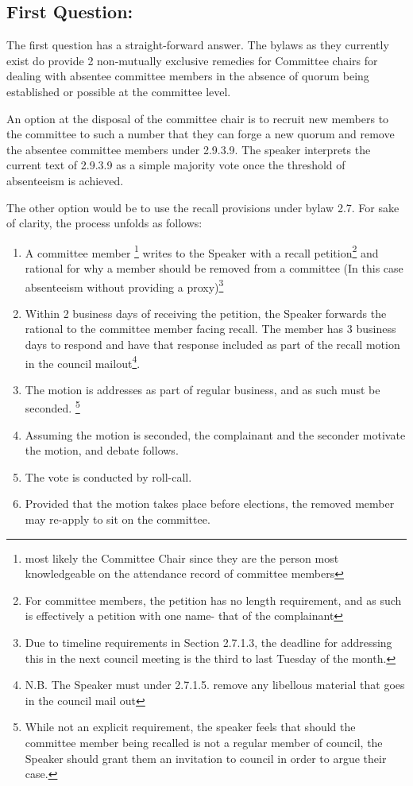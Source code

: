 \documentclass[12pt,letterpaper]{book}
\begin{document}
\subsection*{First Question:}
The first question has a straight-forward answer.  The bylaws as they currently exist do provide 2 non-mutually exclusive remedies for Committee chairs for dealing with absentee committee members in the absence of quorum being established or possible at the committee level. 

An option at the disposal of the committee chair is to recruit new members to the committee to such a number that they can forge a new quorum and remove the absentee committee members under 2.9.3.9.  The speaker interprets the current text of 2.9.3.9 as a simple majority vote once the threshold of absenteeism is achieved.    

The other option would be to use the recall provisions under bylaw 2.7. For sake of clarity, the process unfolds as follows:  

\begin{enumerate}

\item A committee member \footnote{most likely the Committee Chair since they are the person most knowledgeable on the attendance record of committee members} writes to the Speaker with a recall petition\footnote{For committee members, the petition has no length requirement, and as such is effectively a petition with one name- that of the complainant} and rational for why a member should be removed from a committee (In this case absenteeism without providing a proxy)\footnote{Due to timeline requirements in Section 2.7.1.3, the deadline for addressing this in the next council meeting is the third to last Tuesday of the month.}
\item Within 2 business days of receiving the petition, the Speaker forwards the rational to the committee member facing recall. The member has 3 business days to respond and have that response included as part of the recall motion in the council mailout\footnote{N.B. The Speaker must under 2.7.1.5. remove any libellous material that goes in the council mail out}.  
\item The motion is addresses as part of regular business, and as such must be seconded. \footnote{While not an explicit requirement, the speaker feels that should the committee member being recalled is not a regular member of council, the Speaker should grant them an invitation to council in order to argue their case.}  
\item Assuming the motion is seconded, the complainant and the seconder motivate the motion, and debate follows.
\item The vote is conducted by roll-call.
\item Provided that the motion takes place before elections, the removed member may re-apply to sit on the committee.  
\end{enumerate}  
\end{document}

